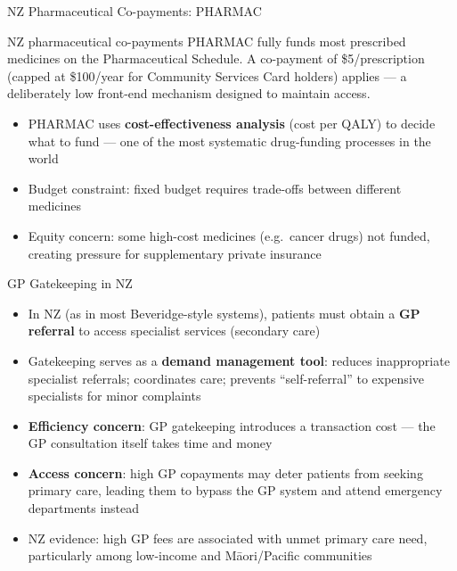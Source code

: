 \documentclass[aspectratio=169, 12pt]{beamer}
\begin{document}
\begin{frame}{NZ Pharmaceutical Co-payments: PHARMAC}
  \begin{exampleblock}{NZ pharmaceutical co-payments}
    PHARMAC fully funds most prescribed medicines on the Pharmaceutical Schedule. A
    co-payment of \$5/prescription (capped at \$100/year for Community Services Card holders)
    applies --- a deliberately low front-end mechanism designed to maintain access.
  \end{exampleblock}
  \begin{itemize}
    \item PHARMAC uses \textbf{cost-effectiveness analysis} (cost per QALY) to decide what
          to fund --- one of the most systematic drug-funding processes in the world
    \item Budget constraint: fixed budget requires trade-offs between different medicines
    \item Equity concern: some high-cost medicines (e.g.\ cancer drugs) not funded, creating
          pressure for supplementary private insurance
  \end{itemize}
\end{frame}

\begin{frame}{GP Gatekeeping in NZ}
  \small
  \begin{itemize}
    \item In NZ (as in most Beveridge-style systems), patients must obtain a \textbf{GP referral}
          to access specialist services (secondary care)
    \item Gatekeeping serves as a \textbf{demand management tool}: reduces inappropriate
          specialist referrals; coordinates care; prevents ``self-referral'' to expensive
          specialists for minor complaints
    \item \textbf{Efficiency concern}: GP gatekeeping introduces a transaction cost ---
          the GP consultation itself takes time and money
    \item \textbf{Access concern}: high GP copayments may deter patients from seeking primary care,
          leading them to bypass the GP system and attend emergency departments instead
    \item NZ evidence: high GP fees are associated with unmet primary care need, particularly
          among low-income and M\=aori/Pacific communities
  \end{itemize}
\end{frame}
\end{document}
